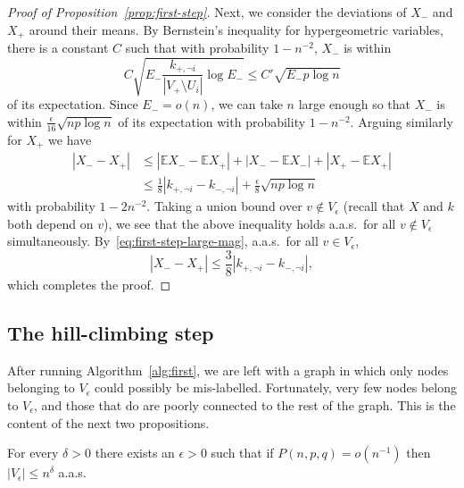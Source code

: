 \documentclass[EJP]{ejpecp}
\newcommand{\E}{\mathbb{E}}
\newcommand{\1}[1]{\mathbbm{1}_{\{#1\}}}
\newcommand{\noti}{\lnot i}
\begin{document}
\begin{proof}[Proof of Proposition~\ref{prop:first-step}]
 Next, we consider the deviations of $X_-$ and $X_+$ around their means.
 By Bernstein's inequality for hypergeometric variables, there is a constant
 $C$ such that with probability $1-n^{-2}$, $X_-$ is within
 \[
  C \sqrt{E_- \frac{k_{+,\noti}}{|V_+ \setminus U_i|} \log E_-}
  \le C' \sqrt{E_- p \log n}
 \]
 of its expectation. Since $E_- = o(n)$, we can take $n$ large enough
 so that $X_-$ is within $\frac{\epsilon}{16}\sqrt{np \log n}$ of its expectation
 with probability $1 - n^{-2}$. Arguing similarly for $X_+$ we have
 \begin{align*}
  |X_- - X_+|
  &\le |\E X_- - \E X_+| + |X_- - \E X_-| + |X_+ - \E X_+| \\
  &\le \frac{1}{8} |k_{+,\noti} - k_{-,\noti}| + \frac{\epsilon}{8} \sqrt{np \log n}
 \end{align*}
 with probability $1-2n^{-2}$. Taking a union bound over $v \not \in V_\epsilon$ (recall that $X$ and $k$ both depend on $v$), we see that the above
 inequality holds a.a.s.\ for all $v \not \in V_\epsilon$ simultaneously.
 By~\eqref{eq:first-step-large-mag}, a.a.s.\ for all $v \in V_\epsilon$,
 \[
   |X_- - X_+| \le \frac 38 |k_{+,\noti} - k_{-,\noti}|,
 \]
 which completes the proof.
\end{proof}

\subsection{The hill-climbing step}\label{sec:second-step}

After running Algorithm~\ref{alg:first}, we are left with a graph
in which only nodes belonging to $V_\epsilon$ could possibly be mis-labelled.
Fortunately, very few nodes belong to $V_\epsilon$, and those that do are poorly
connected to the rest of the graph. This is the content of the next
two propositions.

\begin{proposition}\label{prop:Ve-size}
 For every $\delta > 0$ there exists an $\epsilon > 0$ such that
 if $P(n, p, q) = o(n^{-1})$ then
 $|V_\epsilon| \le n^\delta$ a.a.s.
\end{proposition}
\end{document}
